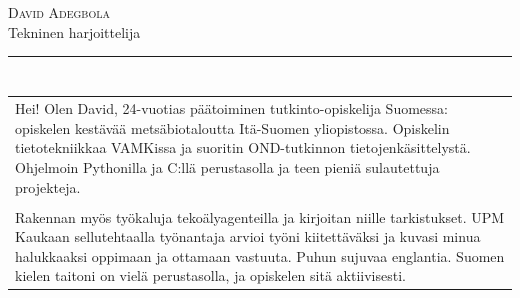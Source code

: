 \documentclass[a4paper,11pt]{article}
\begin{document}
\small
\setlength{\cvlabelw}{3.2cm}
\titlespacing{\section}{0pt}{0.55em}{2pt}

\begin{cvheader}
\par{\centering
		{\Huge \textsc{David Adegbola}}\\[0.4em]
		{\Large Tekninen harjoittelija}
	\bigskip\par}

\hrule
\vspace{0.5em}
\end{cvheader}

\section{}
\begin{tabular}{p{}}
 Hei! Olen David, 24-vuotias päätoiminen tutkinto-opiskelija Suomessa: opiskelen kestävää metsäbiotaloutta Itä-Suomen yliopistossa. Opiskelin tietotekniikkaa VAMKissa ja suoritin OND-tutkinnon tietojenkäsittelystä. Ohjelmoin Pythonilla ja C:llä perustasolla ja teen pieniä sulautettuja projekteja.\\\\

 Rakennan myös työkaluja tekoälyagenteilla ja kirjoitan niille tarkistukset. UPM Kaukaan sellutehtaalla työnantaja arvioi työni kiitettäväksi ja kuvasi minua halukkaaksi oppimaan ja ottamaan vastuuta. Puhun sujuvaa englantia. Suomen kielen taitoni on vielä perustasolla, ja opiskelen sitä aktiivisesti.
\end{tabular}

\section{}
\end{document}
